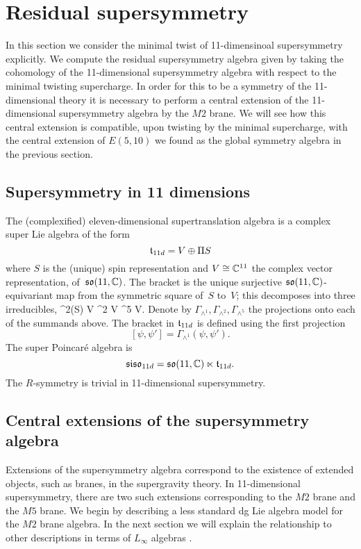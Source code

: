 \section{Residual supersymmetry} 
\label{sec:susy}

In this section we consider the minimal twist of 11-dimensinoal supersymmetry explicitly. 
We compute the residual supersymmetry algebra given by taking the cohomology of the 11-dimensional supersymmetry algebra with respect to the minimal twisting supercharge. 
In order for this to be a symmetry of the 11-dimensional theory it is necessary to perform a central extension of the 11-dimensional supersymmetry algebra by the $M2$ brane.
We will see how this central extension is compatible, upon twisting by the minimal supercharge, with the central extension of $E(5,10)$ we found as the global symmetry algebra in the previous section. 

\subsection{Supersymmetry in 11 dimensions}
\label{sec:11dsusy}

The (complexified) eleven-dimensional supertranslation algebra is a complex super Lie algebra of the form
\[
  \mathfrak t_{11d} = V \oplus \Pi S
\]
where $S$ is the (unique) spin representation and $V \cong \mathbb C^{11}$ the complex vector representation, of~$\mathfrak{so}(11, \mathbb C)$. 
The bracket is the unique surjective $\mathfrak{so}(11,\mathbb C)$-equivariant map from the symmetric square of~$S$ to~$V$;
this decomposes into three irreducibles, 
\beqn\label{eqn:decomp}
  \Sym^2(S) \cong V \oplus \wedge^2 V \oplus \wedge^5 V.
\eeqn
Denote by $\Gamma_{\wedge^1}, \Gamma_{\wedge^2}, \Gamma_{\wedge^5}$ the projections onto each of the summands above. 
The bracket in $\mathfrak t_{11d}$ is defined using the first projection
\[
[\psi, \psi'] = \Gamma_{\wedge^1} (\psi, \psi') .
\]
The super Poincar\'{e} algebra is
\[
  \mathfrak{siso}_{11d} = \mathfrak{so}(11 , \mathbb C) \ltimes \mathfrak t_{11d} .
\]
The $R$-symmetry is trivial in 11-dimensional supersymmetry. 

\subsection{Central extensions of the supersymmetry algebra} 
\label{sec:m2brane}

Extensions of the supersymmetry algebra correspond to the existence of extended objects, such as branes, in the supergravity theory.
In 11-dimensional supersymmetry, there are two such extensions corresponding to the $M2$ brane and the $M5$ brane.
We begin by describing a less standard dg Lie algebra model for the $M2$ brane algebra.
In the next section we will explain the relationship to other descriptions in terms of $L_\infty$ algebras \cite{Basu_2005,Bagger_2007,fiorenza2015super}. 

